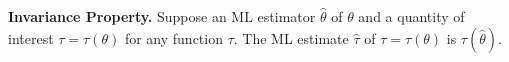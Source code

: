 \documentclass[border=3bp]{standalone}
\begin{document}
\begin{minipage}{3.5in}
\textbf{Invariance Property.} Suppose an ML estimator $\hat{\theta}$ of $\theta$ and a quantity of interest $\tau = \tau(\theta)$ for any function $\tau$. The ML estimate $\hat{\tau}$ of $\tau = \tau(\theta)$ is $\tau(\hat{\theta})$.
\end{minipage}
\end{document}
